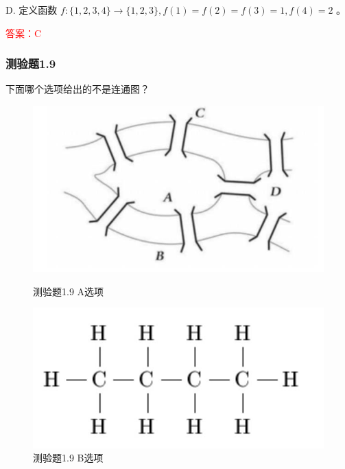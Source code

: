 \documentclass[UTF8, heading=true]{ctexart}
\begin{document}
D. 定义函数 $f:\{1,2,3,4\} \rightarrow\{1,2,3\}, f(1)=f(2)=f(3)=1, f(4)=2$ 。

\textcolor{red}{答案：C}

\subsubsection{测验题1.9}

下面哪个选项给出的不是连通图？

\begin{figure}[htbp]
    \centering
    \begin{minipage}[t]{0.35\textwidth}
        \centering
        \includegraphics[width=1\textwidth]{1.9_1.jpg} %
        \caption{测验题1.9 A选项}
    \end{minipage}
    \hfill
    \begin{minipage}[t]{0.35\textwidth}
        \centering
        \includegraphics[width=1\textwidth]{1.9_2.jpg} %
        \caption{测验题1.9 B选项}
\end{minipage}
\end{figure}
\end{document}
